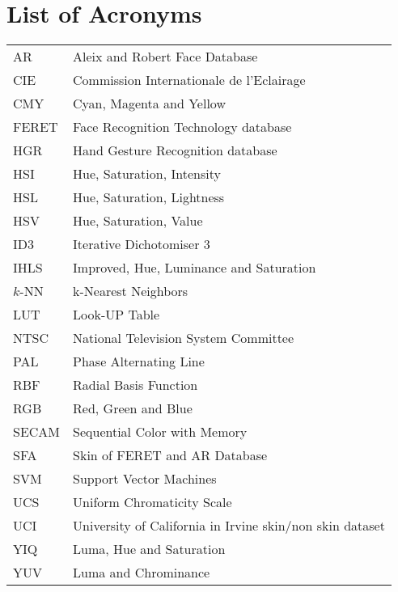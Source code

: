 \documentclass[11pt,twoside,a4paper]{book}
\theoremstyle{plain}
\theoremstyle{definition}
\begin{document}
\chapter{List of Acronyms}
\begin{tabular}{ll}
    AR          & Aleix and Robert Face Database\\
    CIE         & Commission Internationale de l'Eclairage\\
    CMY         & Cyan, Magenta and Yellow\\
    FERET       & Face Recognition Technology database\\
    HGR         & Hand Gesture Recognition database\\
    HSI         & Hue, Saturation, Intensity\\
    HSL         & Hue, Saturation, Lightness\\
    HSV         & Hue, Saturation, Value\\
    ID3         & Iterative Dichotomiser 3\\
    IHLS        & Improved, Hue, Luminance and Saturation\\
    $k$-NN      & k-Nearest Neighbors\\
    LUT         & Look-UP Table\\
    NTSC        & National Television System Committee\\
    PAL         & Phase Alternating Line\\
    RBF         & Radial Basis Function\\
    RGB         & Red, Green and Blue\\
    SECAM       & Sequential Color with Memory\\
    SFA         & Skin of FERET and AR Database\\
    SVM         & Support Vector Machines\\
    UCS         & Uniform Chromaticity Scale\\
    UCI         & University of California in Irvine skin/non skin dataset\\
    YIQ         & Luma, Hue and Saturation\\
    YUV         & Luma and Chrominance\\
\end{tabular}

\end{document}

